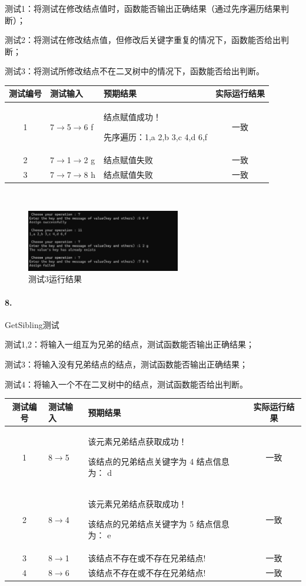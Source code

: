 \documentclass[supercite]{Experimental_Report}
\theoremstyle{definition}
\begin{document}
测试1：将测试在修改结点值时，函数能否输出正确结果（通过先序遍历结果判断）；

测试2：将测试在修改结点值，但修改后关键字重复的情况下，函数能否给出判断；

测试3：将测试所修改结点不在二叉树中的情况下，函数能否给出判断。

\vspace{0.5em}

\begin{tabular}{|c|l|p{6cm}|c|}
	\hline
	测试编号 & 测试输入 & 预期结果 & 实际运行结果 \\
	\hline
	1 & 7$\rightarrow$5$\rightarrow$6 f & 结点赋值成功！

先序遍历：1,a 2,b 3,c 4,d 6,f & 一致 \\
	\hline
	2 & 7$\rightarrow$1$\rightarrow$2 g & 结点赋值失败 & 一致 \\
	\hline
	3 & 7$\rightarrow$7$\rightarrow$8 h & 结点赋值失败 & 一致 \\
	\hline
\end{tabular}

~\

\begin{figure}[H]
 	\centering
 	\includegraphics[width=0.6\textwidth]{images/二叉树测试7.png}
 	\caption{测试3运行结果}
 	\label{txlab}
 \end{figure}

\paragraph{ 8.}GetSibling测试

测试1,2：将输入一组互为兄弟的结点，测试函数能否输出正确结果；

测试3：将输入没有兄弟结点的结点，测试函数能否输出正确结果；

测试4：将输入一个不在二叉树中的结点，测试函数能否给出判断。

\vspace{0.5em}

\begin{tabular}{|c|l|p{7cm}|c|}
	\hline
	测试编号 & 测试输入 & 预期结果 & 实际运行结果 \\
	\hline
	1 & 8$\rightarrow$5 & 该元素兄弟结点获取成功！

该结点的兄弟结点关键字为 4 结点信息为： d & 一致 \\
	\hline
	2 & 8$\rightarrow$4 & 该元素兄弟结点获取成功！

该结点的兄弟结点关键字为 5 结点信息为： e & 一致 \\
	\hline
	3 & 8$\rightarrow$1 & 该结点不存在或不存在兄弟结点! & 一致 \\
	\hline
	4 & 8$\rightarrow$6 & 该结点不存在或不存在兄弟结点! & 一致 \\
	\hline
\end{tabular}
\end{document}
